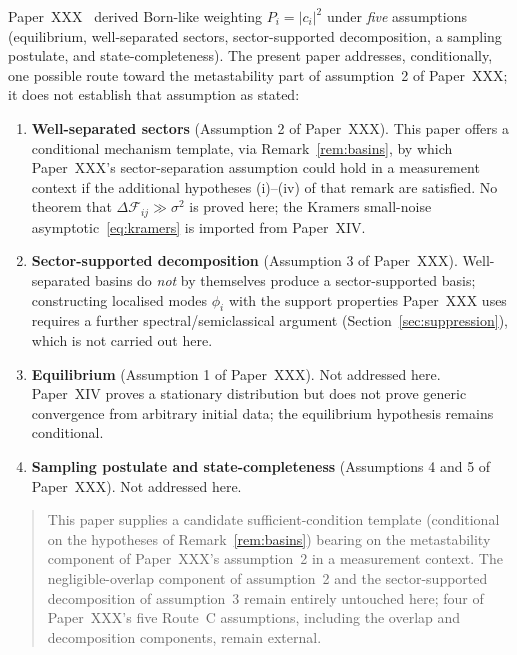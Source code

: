 \documentclass[12pt]{article}
\newcommand{\Fcal}{\mathcal{F}}
\begin{document}
Paper~XXX~\citep{SmartXXX} derived Born-like weighting $P_i = |c_i|^2$ under \emph{five} assumptions (equilibrium, well-separated sectors, sector-supported decomposition, a sampling postulate, and state-completeness). The present paper addresses, conditionally, one possible route toward the metastability part of assumption~2 of Paper~XXX; it does not establish that assumption as stated:

\begin{enumerate}
    \item \textbf{Well-separated sectors} (Assumption 2 of Paper~XXX). This paper offers a conditional mechanism template, via Remark~\ref{rem:basins}, by which Paper~XXX's sector-separation assumption could hold in a measurement context if the additional hypotheses (i)--(iv) of that remark are satisfied. No theorem that $\Delta\Fcal_{ij} \gg \sigma^2$ is proved here; the Kramers small-noise asymptotic~\eqref{eq:kramers} is imported from Paper~XIV.

    \item \textbf{Sector-supported decomposition} (Assumption 3 of Paper~XXX). Well-separated basins do \emph{not} by themselves produce a sector-supported basis; constructing localised modes $\phi_i$ with the support properties Paper~XXX uses requires a further spectral/semiclassical argument (Section~\ref{sec:suppression}), which is not carried out here.

    \item \textbf{Equilibrium} (Assumption 1 of Paper~XXX). Not addressed here. Paper~XIV proves a stationary distribution but does not prove generic convergence from arbitrary initial data; the equilibrium hypothesis remains conditional.

    \item \textbf{Sampling postulate and state-completeness} (Assumptions 4 and 5 of Paper~XXX). Not addressed here.
\end{enumerate}

\begin{quote}
This paper supplies a candidate sufficient-condition template (conditional on the hypotheses of Remark~\ref{rem:basins}) bearing on the metastability component of Paper~XXX's assumption~2 in a measurement context. The negligible-overlap component of assumption~2 and the sector-supported decomposition of assumption~3 remain entirely untouched here; four of Paper~XXX's five Route~C assumptions, including the overlap and decomposition components, remain external.
\end{quote}
\end{document}
